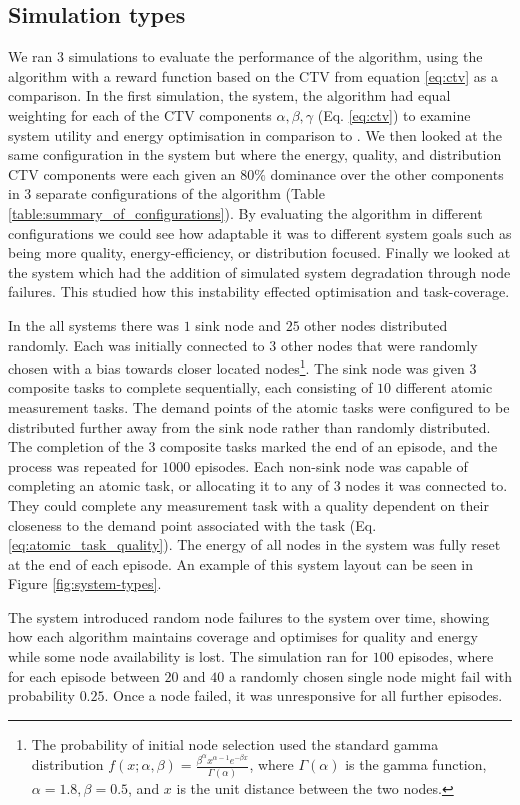 \subsection{Simulation types}
We ran $3$ simulations to evaluate the performance of the algorithm, using the \acronymQRouting{}{} algorithm \citep{Boyan} with a reward function based on the CTV from equation \ref{eq:ctv} as a comparison. In the first simulation, the \simulationSimple{}{} system,  the \acronymWSNOptimisation{}{} algorithm had
equal weighting for each of the CTV components $\alpha, \beta, \gamma$ (Eq. \ref{eq:ctv}) to examine system utility and energy optimisation in comparison to \acronymQRouting{}{}.  We then looked at the same configuration in the \simulationExtended{}{} system but where the energy, quality, and distribution CTV components were each given an $80\%$ dominance over the other components in $3$ separate configurations of the algorithm (Table \ref{table:summary_of_configurations}). By evaluating the algorithm in different configurations we could see how adaptable it was to different system goals such as being more quality, energy-efficiency, or distribution focused. Finally we looked at the \simulationNodeFailure{}{} system which had the addition of simulated system degradation through node failures. This studied how this instability effected optimisation and task-coverage.  

In the all systems there was  $1$ sink node and $25$ other nodes distributed randomly. Each was initially connected to $3$ other nodes that were randomly chosen with a bias towards closer located nodes\footnote{
		The probability of initial node selection used the standard gamma distribution $f(x; \alpha, \beta) = \frac{\beta^{\alpha} x^{\alpha-1}e^{- \beta x}}   {\Gamma(\alpha)}$, where $\Gamma(\alpha)$ is the  gamma function, $\alpha=1.8, \beta=0.5$, and $x$ is the unit distance between the two nodes.
	}. 
The sink node was given $3$ composite tasks to complete sequentially, each consisting of $10$ different atomic measurement tasks. The demand points of the atomic tasks were configured to be distributed further away from the sink node rather than randomly distributed. The completion of the $3$ composite tasks marked the end of an episode, and the process was repeated for $1000$ episodes. Each non-sink node was capable of completing an atomic task, or allocating it to any of $3$ nodes it was connected to. They could complete any measurement task with a quality dependent on their closeness to the demand point associated with the task (Eq. \ref{eq:atomic_task_quality}). The energy of all nodes in the system was fully reset at the end of each episode. An example of this system layout can be seen in Figure \ref{fig:system-types}. 

The \simulationNodeFailure{}{} system introduced random node failures to the system over time, showing how each algorithm maintains coverage and optimises for quality and energy while some node availability is lost. The simulation ran for $100$ episodes, where for each episode between $20$ and $40$  a randomly chosen single node might fail with probability $0.25$. Once a node failed, it was unresponsive for all further episodes. 

 
